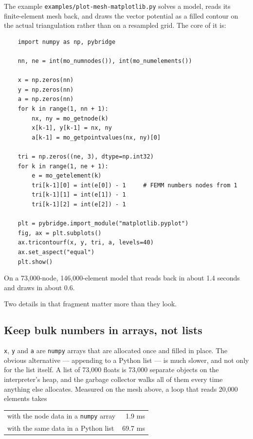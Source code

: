 The example {\tt examples/plot-mesh-matplotlib.py} solves a model, reads its
finite-element mesh back, and draws the vector potential as a filled contour on
the actual triangulation rather than on a resampled grid.  The core of it is:

\begin{verbatim}
    import numpy as np, pybridge

    nn, ne = int(mo_numnodes()), int(mo_numelements())

    x = np.zeros(nn)
    y = np.zeros(nn)
    a = np.zeros(nn)
    for k in range(1, nn + 1):
        nx, ny = mo_getnode(k)
        x[k-1], y[k-1] = nx, ny
        a[k-1] = mo_getpointvalues(nx, ny)[0]

    tri = np.zeros((ne, 3), dtype=np.int32)
    for k in range(1, ne + 1):
        e = mo_getelement(k)
        tri[k-1][0] = int(e[0]) - 1     # FEMM numbers nodes from 1
        tri[k-1][1] = int(e[1]) - 1
        tri[k-1][2] = int(e[2]) - 1

    plt = pybridge.import_module("matplotlib.pyplot")
    fig, ax = plt.subplots()
    ax.tricontourf(x, y, tri, a, levels=40)
    ax.set_aspect("equal")
    plt.show()
\end{verbatim}

On a 73,000-node, 146,000-element model that reads back in about 1.4 seconds
and draws in about 0.6.

Two details in that fragment matter more than they look.

\subsection*{Keep bulk numbers in arrays, not lists}

{\tt x}, {\tt y} and {\tt a} are {\tt numpy} arrays that are allocated once and
filled in place.  The obvious alternative --- appending to a Python list --- is
much slower, and not only for the list itself.  A list of 73,000 floats is
73,000 separate objects on the interpreter's heap, and the garbage collector
walks all of them every time anything else allocates.  Measured on the mesh
above, a loop that reads 20,000 elements takes

\begin{center}
\begin{tabular}{lr}
with the node data in a {\tt numpy} array & 1.9 ms \\
with the same data in a Python list       & 69.7 ms \\
\end{tabular}
\end{center}

